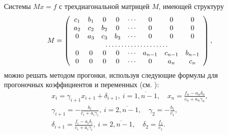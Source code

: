 {Системы $ Mx = f $ с трехдиагональной матрицей $ M $, имеющей структуру
\[
  M = \left(\begin{array}{cccccccc}
              c_1 & b_1 & 0   & 0   & \cdots & 0       & 0       & 0       \\
              a_2 & c_2 & b_2 & 0   & \cdots & 0       & 0       & 0       \\
              0   & a_3 & c_3 & b_3 & \cdots & 0       & 0       & 0       \\
              \hdotsfor{8}                                                 \\
              0   & 0   & 0   & 0   & \cdots & a_{n-1} & c_{n-1} & b_{n-1} \\
              0   & 0   & 0   & 0   & \cdots & 0       & a_n     & c_n
            \end{array}\right),
\]
можно решать методом прогонки, используя следующие формулы для прогоночных коэффициентов и переменных (см. \cite{samarsky89}):
\begin{gather}
  \label{ch1:eq:tridiagonal-book}
  x_i = \gamma_{i+1} x_{i+1} + \delta_{i+1}, \: i = \overline{1,n-1},
  \quad
  x_n = \frac{f_n - a_n\delta_n}{c_n + a_n\gamma_n}, \\
  \gamma_{i+1} = -\frac{b_i}{c_i + a_i\gamma_i}, \: i = \overline{2,
    n-1}, \quad
  \gamma_2 = -\frac{b_1}{c_1}, \\
  \delta_{i+1} = \frac{f_i - a_i\delta_i}{c_i + a_i\gamma_i}, \: i =
  \overline{2, n-1}, \quad \delta_2 = \frac{f_1}{c_1}.
\end{gather}

}
